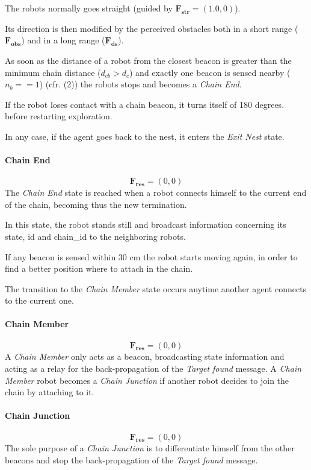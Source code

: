 The robots normally goes straight (guided by $\mathbf{F_{str}} = (1.0,0)$).

Its direction is then modified by the perceived obstacles both in a short range ($\mathbf{F_{obs}}$) and in a long range 
($\mathbf{F_{ds}}$).

As soon as the distance of a robot from the closest beacon is greater than the minimum chain distance ($d_{cb} > d_c$)
and exactly one beacon is sensed nearby ($n_b == 1$) (cfr.  (2)) 
the robots stops and becomes a \emph{Chain End}.

If the robot loses contact with a chain beacon, it turns itself of 180 degrees. before 
restarting exploration.

In any case, if the agent goes back to the nest, it enters the \emph{Exit Nest} state.


\paragraph{Chain End}
\begin{equation}
  \mathbf{F_{res}} = (0,0)
\end{equation}
The \emph{Chain End} state is reached when a robot connects himself to the current end of the chain, becoming thus the new termination.

In this state, the robot stands still and broadcast information concerning its state, id and chain\_id to the neighboring robots.

If any beacon is sensed within 30 cm the robot starts moving again, in order to 
find a better position where to attach in the chain.

The transition to the \emph{Chain Member} state occurs anytime another agent connects to the current one.

\paragraph{Chain Member}
\begin{equation}
  \mathbf{F_{res}} = (0,0)
\end{equation}
A \emph{Chain Member} only acts as a beacon, broadcasting state information and acting as a relay for the back-propagation of the \emph{Target found} message.
A \emph{Chain Member} robot becomes a \emph{Chain Junction} if another robot decides to 
join the chain by attaching to it.

\paragraph{Chain Junction}
\begin{equation}
  \mathbf{F_{res}} = (0,0)
\end{equation}
The sole purpose of a \emph{Chain Junction} is to differentiate himself from the other beacons and stop the back-propagation of the \emph{Target found} message.
